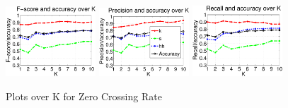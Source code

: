 \begin{figure}
	\centering\includegraphics[width=0.3\textwidth]{tex/appendices/test/zcr11FP.png}
	\centering\includegraphics[width=0.3\textwidth]{tex/appendices/test/zcr11_P.png}
	\centering\includegraphics[width=0.3\textwidth]{tex/appendices/test/zcr11_R.png}
	\caption{Plots over K for Zero Crossing Rate}
\end{figure}


